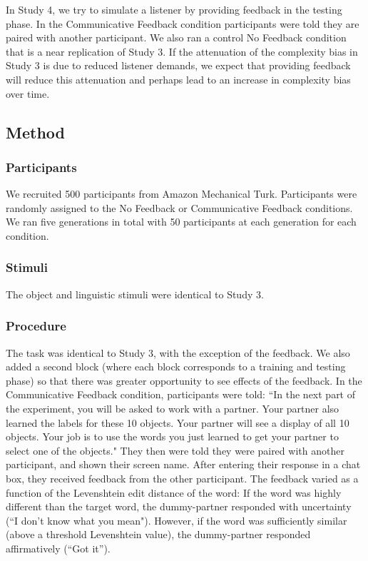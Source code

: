 In Study 4, we try to simulate a listener by providing feedback in the testing phase. In the Communicative Feedback condition participants were told they are paired with another participant. We also ran a control No Feedback condition that is a near replication of Study 3. If the attenuation of the complexity bias in Study 3 is due to reduced listener demands, we expect that providing feedback will reduce this attenuation and perhaps lead to an increase in complexity bias over time. 

\subsection{Method}

\subsubsection{Participants}
We recruited 500 participants from Amazon Mechanical Turk. Participants were randomly assigned to the No Feedback or Communicative Feedback conditions. We ran five generations in total with 50 participants at each generation for each condition.

\subsubsection{Stimuli}
The object and linguistic stimuli were identical to Study 3.

\subsubsection{Procedure}
The task was identical to Study 3, with the exception of the feedback. We also added a second block (where each block corresponds to a training and testing phase) so that there was greater opportunity to see effects of the feedback. In the Communicative Feedback condition, participants were told: ``In the next part of the experiment, you will be asked to work with a partner. Your partner also learned the labels for these 10 objects. Your partner will see a display of all 10 objects. Your job is to use the words you just learned to get your partner to select one of the objects." They then were  told they were paired with another participant, and shown their screen name. After entering their response in a chat box, they received feedback from the other participant. The feedback varied as a function of the Levenshtein edit distance of the word: If the word was highly different than the target word, the  dummy-partner responded with uncertainty (``I don't know what you mean"). However, if the word was sufficiently similar (above a threshold Levenshtein value), the dummy-partner responded affirmatively (``Got it'').

